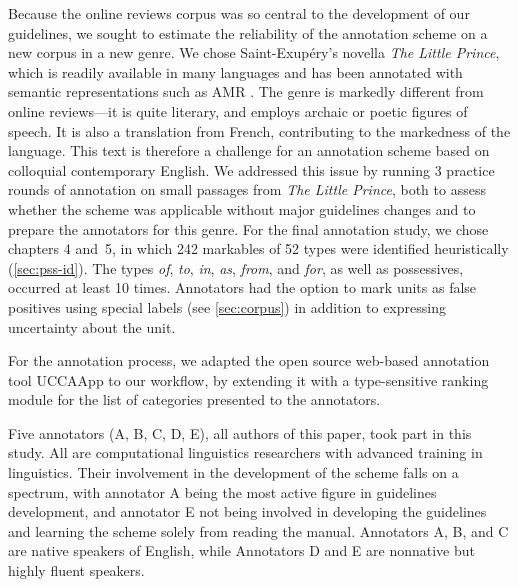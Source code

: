 \pdfoutput=1 \documentclass[11pt,a4paper]{article}
\makeatletter
\renewcommand{\paragraph}{\@startsection{paragraph}{4}{\z@}{.2ex \@plus 1ex \@minus .2ex}{-1em}{\normalfont\normalsize\bfseries}}
\makeatother
\begin{document}
Because the online reviews corpus was so central to the development of our guidelines, we sought to estimate the reliability of the annotation scheme on a new corpus in a new genre. We chose Saint-Exup\'{e}ry's 
novella \emph{The Little Prince}, which is readily available in many languages and has been  annotated with semantic representations such as AMR \citep{amr}.
The genre is markedly different from online reviews---it is quite literary, and employs archaic or 
poetic figures of speech. 
It is also a translation from French, contributing to the markedness of the language.
This text is therefore a challenge for an annotation scheme based on colloquial contemporary English.
We addressed this issue by running 3 practice rounds of annotation on small passages from \emph{The Little Prince}, both to assess whether the scheme was applicable without major guidelines changes and to prepare the annotators for this genre.
For the final annotation study, we chose chapters 4 and~5, in which
242 markables of 52 types were identified heuristically (\cref{sec:pss-id}). 
The types \textit{of}, \textit{to}, \textit{in}, \textit{as}, \textit{from}, and \textit{for}, as well as possessives, occurred at least 10 times.
Annotators had the option to mark units as false positives using special labels (see \cref{sec:corpus}) in addition to expressing uncertainty about the unit. 



For the annotation process, we adapted the open source web-based annotation tool UCCAApp \citep{abend-17-uccaapp} to our workflow, 
by extending it with a type-sensitive ranking module for the list of categories presented to the annotators.


\paragraph{Annotators.}
Five annotators (A, B, C, D, E), all authors of this paper, took part in this study. All are computational linguistics researchers with advanced training in linguistics. 
Their involvement in the development of the scheme falls on a spectrum, with annotator A being the most active figure in guidelines development, and annotator E not being involved in developing the guidelines and learning the scheme solely from reading the manual. Annotators A, B, and C are native speakers of English, while Annotators D and E are nonnative but highly fluent speakers.
\end{document}
